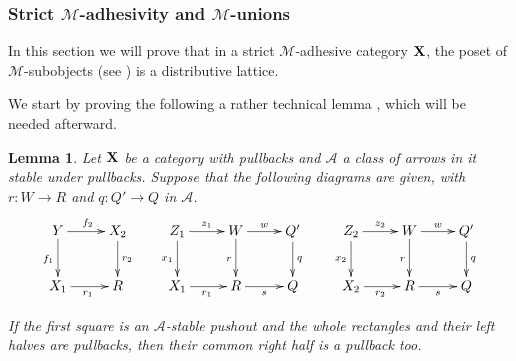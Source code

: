 \documentclass[a4paper]{article}
\def\X{\textbf {\textup{X}}}
\newtheorem{lemma}[theorem]{Lemma}
\theoremstyle{definition}
\begin{document}
\subsubsection{Strict $\mathcal{M}$-adhesivity and $\mathcal{M}$-unions} 
 
 In this section we will prove that in a strict $\mathcal{M}$-adhesive category $\X$, the poset of $\mathcal{M}$-subobjects (see  ) is a distributive lattice.
 
 We start by  proving the following a rather technical lemma \cite{garner2012axioms}, which will be needed afterward.
 
\begin{lemma}\label{lem:pb2}
	Let $\X$ be a category with pullbacks and $\mathcal{A}$  a class of arrows in it  stable under pullbacks. Suppose that  the following diagrams are given, with $r\colon W\to R$ and $q\colon Q'\to Q$ in $\mathcal{A}$.
	\[
	\xymatrix{Y\ar[r]^{f_2} \ar[d]_{f_1} & X_2 \ar[d]^{r_2} & Z_1 \ar[d]_{x_1}\ar[r]^{z_1} & W \ar[r]^{w} \ar[d]_{r} & Q'\ar[d]^{q} & Z_2 \ar[d]_{x_2} \ar[r]^{z_2}  & W  \ar[r]^{w} \ar[d]_{r}  & Q' \ar[d]^{q}\\ X_1 \ar[r]_{r_1} &R  & X_1 \ar[r]_{r_1} & R \ar[r]_{s}  & Q& X_2 \ar[r]_{r_2} & R \ar[r]_{s} & Q}\]
	
	If the first square is an $\mathcal{A}$-stable pushout and the whole rectangles and their left halves are pullbacks, then their common right half is a pullback too.
\end{lemma}
\end{document}
